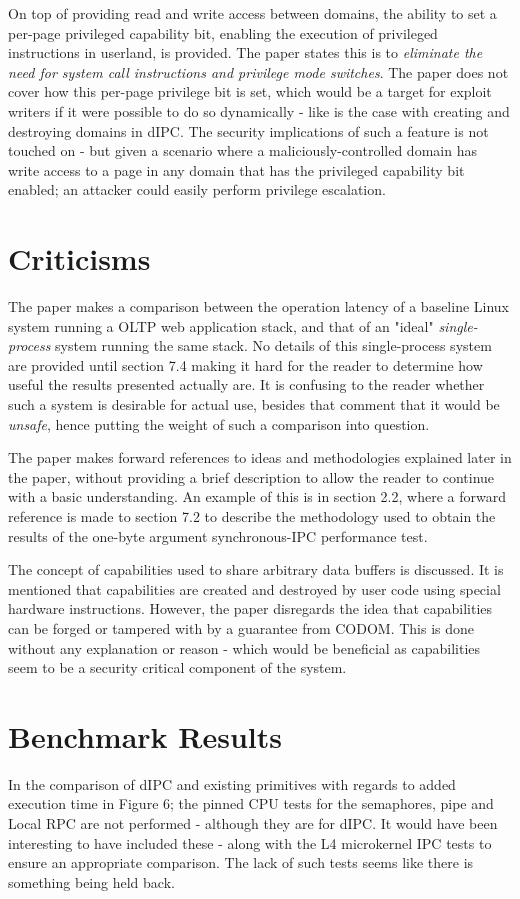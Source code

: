 \documentclass{article}
\begin{document}
On top of providing read and write access between domains, the ability to set a per-page privileged capability bit, enabling the execution of privileged instructions in userland, is provided. The paper states this is to \textit{eliminate the need for system call instructions and privilege mode switches}. The paper does not cover how this per-page privilege bit is set, which would be a target for exploit writers if it were possible to do so dynamically - like is the case with creating and destroying domains in dIPC. The security implications of such a feature is not touched on - but given a scenario where a maliciously-controlled domain has write access to a page in any domain that has the privileged capability bit enabled; an attacker could easily perform privilege escalation.


\section*{Criticisms}
The paper makes a comparison between the operation latency of a baseline Linux system running a OLTP web application stack, and that of an "ideal" \textit{single-process} system running the same stack. No details of this single-process system are provided until section 7.4 making it hard for the reader to determine how useful the results presented actually are. It is confusing to the reader whether such a system is desirable for actual use, besides that comment that it would be \textit{unsafe}, hence putting the weight of such a comparison into question.

The paper makes forward references to ideas and methodologies explained later in the paper, without providing a brief description to allow the reader to continue with a basic understanding. An example of this is in section 2.2, where a forward reference is made to section 7.2 to describe the methodology used to obtain the results of the one-byte argument synchronous-IPC performance test.

The concept of capabilities used to share arbitrary data buffers is discussed. It is mentioned that capabilities are created and destroyed by user code using special hardware instructions. However, the paper disregards the idea that capabilities can be forged or tampered with by a guarantee from CODOM. This is done without any explanation or reason - which would be beneficial as capabilities seem to be a security critical component of the system.


\section*{Benchmark Results}
In the comparison of dIPC and existing primitives with regards to added execution time in Figure 6; the pinned CPU tests for the semaphores, pipe and Local RPC are not performed - although they are for dIPC. It would have been interesting to have included these - along with the L4 microkernel IPC tests to ensure an appropriate comparison. The lack of such tests seems like there is something being held back.
\end{document}
